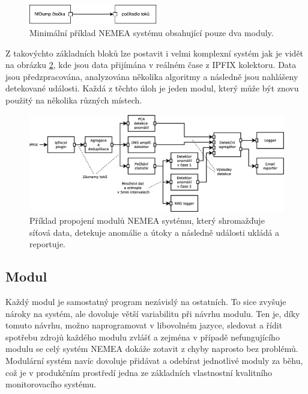 \begin{figure}[h]
    \centering
    \includegraphics[width=0.5\textwidth]{fig/nemea-basic.pdf}
    \caption{Minimální příklad NEMEA systému obsahující pouze dva moduly.} \label{fig:nemea-schema}
  
\end{figure}

Z takovýchto základních bloků lze postavit i velmi komplexní systém jak je vidět na obrázku \ref{fig:nemea-example-2}, kde jsou data přijímána v reálném čase z IPFIX\cite{ipfix} kolektoru. Data jsou předzpracována, analyzována několika algoritmy a následně jsou nahlášeny detekované události. Každá z těchto úloh je jeden modul, který může být znovu použitý na několika různých místech.

\begin{figure}[h]
    \centering
    \includegraphics[width=1\textwidth]{fig/nemea-example-2-cz.eps}
    \caption{Příklad propojení modulů NEMEA systému, který shromažďuje síťová data, detekuje anomálie a útoky a následně události ukládá a reportuje.} \label{fig:nemea-example-2}
  
\end{figure}



\subsection{Modul}

Každý modul je samostatný program nezávislý na ostatních. To sice zvyšuje nároky na systém, ale dovoluje větší variabilitu při návrhu modulu. Ten je, díky tomuto návrhu, možno naprogramovat v libovolném jazyce, sledovat a řídit spotřebu zdrojů každého modulu zvlášť a zejména v případě nefungujícího modulu se celý systém NEMEA dokáže zotavit z chyby naprosto bez problémů. Modulární systém navíc dovoluje přidávat a odebírat jednotlivé moduly za běhu, což je v produkčním prostředí jedna ze základních vlastnostní kvalitního monitorovacího systému.

